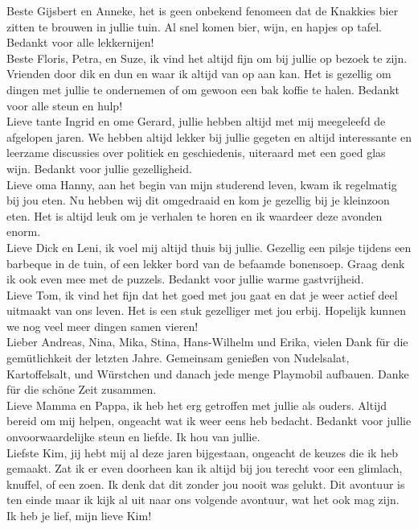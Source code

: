 \indent Beste Gijsbert en Anneke, het is geen onbekend fenomeen dat de
Knakkies bier zitten te brouwen in jullie tuin. Al snel komen bier, wijn, en
hapjes op tafel. Bedankt voor alle lekkernijen!\\
\indent Beste Floris, Petra, en Suze, ik vind het altijd fijn om bij jullie op
bezoek te zijn. Vrienden door dik en dun en waar ik altijd van op aan kan. Het
is gezellig om dingen met jullie te ondernemen of om gewoon een bak koffie te
halen. Bedankt voor alle steun en hulp!\\
\indent Lieve tante Ingrid en ome Gerard, jullie hebben altijd met mij
meegeleefd de afgelopen jaren. We hebben altijd lekker bij jullie gegeten en
altijd interessante en leerzame discussies over politiek en geschiedenis,
uiteraard met een goed glas wijn. Bedankt voor jullie gezelligheid.\\
\indent Lieve oma Hanny, aan het begin van mijn studerend leven, kwam ik
regelmatig bij jou eten. Nu hebben wij dit omgedraaid en kom je gezellig bij
je kleinzoon eten. Het is altijd leuk om je verhalen te horen en ik waardeer
deze avonden enorm.\\
\indent Lieve Dick en Leni, ik voel mij altijd thuis bij jullie. Gezellig een
pilsje tijdens een barbeque in de tuin, of een lekker bord van de befaamde
bonensoep. Graag denk ik ook even mee met de puzzels. Bedankt voor
jullie warme gastvrijheid.\\ 
\indent Lieve Tom, ik vind het fijn dat het goed met jou gaat en dat je weer
actief deel uitmaakt van ons leven. Het is een stuk gezelliger met jou erbij.
Hopelijk kunnen we nog veel meer dingen samen vieren!\\
\mfl{\flagdet}\indent Lieber Andreas, Nina, Mika, Stina, Hans-Wilhelm und
Erika, vielen Dank für die gem\"utlichkeit der letzten Jahre. Gemeinsam
genie{\ss}en von Nudelsalat, Kartoffelsalt, und W\"urstchen und danach jede
menge Playmobil aufbauen. Danke f\"ur die sch\"one Zeit zusammen.\\
\mfl{\flagnld}\indent Lieve Mamma en Pappa, ik heb het erg getroffen met
jullie als ouders. Altijd bereid om mij helpen, ongeacht wat ik weer eens heb
bedacht. Bedankt voor jullie onvoorwaardelijke steun en liefde. Ik hou van
jullie.\\
\indent Liefste Kim, jij hebt mij al deze jaren bijgestaan, ongeacht de keuzes
die ik heb gemaakt. Zat ik er even doorheen kan ik altijd bij jou terecht voor
een glimlach, knuffel, of een zoen. Ik denk dat dit zonder jou nooit was
gelukt. Dit avontuur is ten einde maar ik kijk al uit naar ons volgende
avontuur, wat het ook mag zijn. Ik heb je lief, mijn lieve Kim! 

